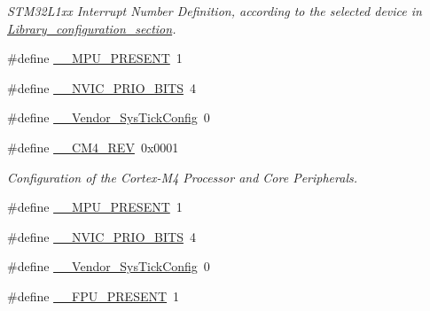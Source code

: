 \begin{DoxyCompactItemize}
\begin{DoxyCompactList}\small\item\em S\-T\-M32\-L1xx Interrupt Number Definition, according to the selected device in \hyperlink{group___library__configuration__section}{Library\-\_\-configuration\-\_\-section}. \end{DoxyCompactList}\item 
\#define \hyperlink{group___configuration__section__for___c_m_s_i_s_ga4127d1b31aaf336fab3d7329d117f448}{\-\_\-\-\_\-\-M\-P\-U\-\_\-\-P\-R\-E\-S\-E\-N\-T}~1
\item 
\#define \hyperlink{group___configuration__section__for___c_m_s_i_s_gae3fe3587d5100c787e02102ce3944460}{\-\_\-\-\_\-\-N\-V\-I\-C\-\_\-\-P\-R\-I\-O\-\_\-\-B\-I\-T\-S}~4
\item 
\#define \hyperlink{group___configuration__section__for___c_m_s_i_s_gab58771b4ec03f9bdddc84770f7c95c68}{\-\_\-\-\_\-\-Vendor\-\_\-\-Sys\-Tick\-Config}~0
\item 
\#define \hyperlink{group___configuration__section__for___c_m_s_i_s_ga45a97e4bb8b6ce7c334acc5f45ace3ba}{\-\_\-\-\_\-\-C\-M4\-\_\-\-R\-E\-V}~0x0001
\begin{DoxyCompactList}\small\item\em Configuration of the Cortex-\/\-M4 Processor and Core Peripherals. \end{DoxyCompactList}\item 
\#define \hyperlink{group___configuration__section__for___c_m_s_i_s_ga4127d1b31aaf336fab3d7329d117f448}{\-\_\-\-\_\-\-M\-P\-U\-\_\-\-P\-R\-E\-S\-E\-N\-T}~1
\item 
\#define \hyperlink{group___configuration__section__for___c_m_s_i_s_gae3fe3587d5100c787e02102ce3944460}{\-\_\-\-\_\-\-N\-V\-I\-C\-\_\-\-P\-R\-I\-O\-\_\-\-B\-I\-T\-S}~4
\item 
\#define \hyperlink{group___configuration__section__for___c_m_s_i_s_gab58771b4ec03f9bdddc84770f7c95c68}{\-\_\-\-\_\-\-Vendor\-\_\-\-Sys\-Tick\-Config}~0
\item 
\#define \hyperlink{group___configuration__section__for___c_m_s_i_s_gac1ba8a48ca926bddc88be9bfd7d42641}{\-\_\-\-\_\-\-F\-P\-U\-\_\-\-P\-R\-E\-S\-E\-N\-T}~1
\end{DoxyCompactItemize}
